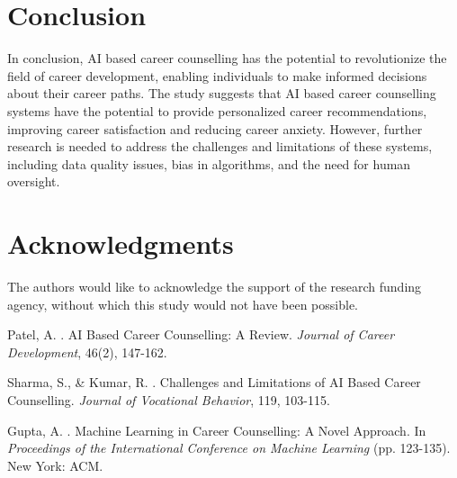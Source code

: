 \documentclass[12pt,a4paper]{article}
\begin{document}
\section{Conclusion}
In conclusion, AI based career counselling has the potential to revolutionize the field of career development, enabling individuals to make informed decisions about their career paths. The study suggests that AI based career counselling systems have the potential to provide personalized career recommendations, improving career satisfaction and reducing career anxiety. However, further research is needed to address the challenges and limitations of these systems, including data quality issues, bias in algorithms, and the need for human oversight.

\section*{Acknowledgments}
The authors would like to acknowledge the support of the research funding agency, without which this study would not have been possible.


\begin{thebibliography}{99}

Patel, A. . AI Based Career Counselling: A Review. \emph{Journal of Career Development}, 46(2), 147-162.

Sharma, S., \& Kumar, R. . Challenges and Limitations of AI Based Career Counselling. \emph{Journal of Vocational Behavior}, 119, 103-115.

Gupta, A. . Machine Learning in Career Counselling: A Novel Approach. In \emph{Proceedings of the International Conference on Machine Learning} (pp. 123-135). New York: ACM.

\end{thebibliography}
\end{document}
